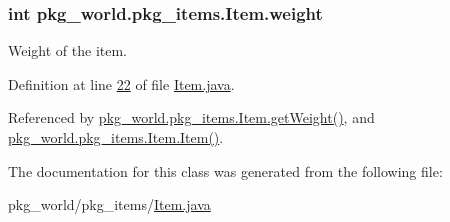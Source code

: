 \hypertarget{classpkg__world_1_1pkg__items_1_1Item_a3550e4e4d450da85707ad86b33e88667}{
\subsubsection[{weight}]{\setlength{\rightskip}{0pt plus 5cm}int pkg\-\_\-world.\-pkg\-\_\-items.\-Item.\-weight\hspace{0.3cm}{\ttfamily [private]}}}\label{classpkg__world_1_1pkg__items_1_1Item_a3550e4e4d450da85707ad86b33e88667}


Weight of the item. 



Definition at line \hyperlink{Item_8java_source_l00022}{22} of file \hyperlink{Item_8java_source}{Item.\-java}.



Referenced by \hyperlink{Item_8java_source_l00053}{pkg\-\_\-world.\-pkg\-\_\-items.\-Item.\-get\-Weight()}, and \hyperlink{Item_8java_source_l00035}{pkg\-\_\-world.\-pkg\-\_\-items.\-Item.\-Item()}.



The documentation for this class was generated from the following file\-:\begin{DoxyCompactItemize}
\item 
pkg\-\_\-world/pkg\-\_\-items/\hyperlink{Item_8java}{Item.\-java}\end{DoxyCompactItemize}
